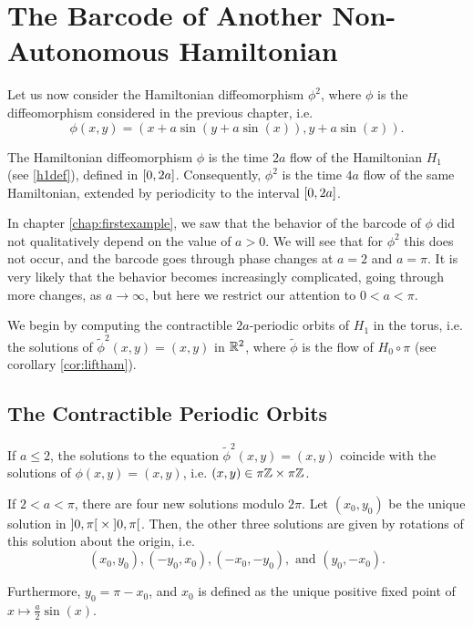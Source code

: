 \chapter{The Barcode of Another Non-Autonomous Hamiltonian}
\label{chap:secondexample}

Let us now consider the Hamiltonian diffeomorphism $\phi^2$, where $\phi$ is the diffeomorphism considered in the previous chapter, i.e.
\begin{equation}
\phi(x,y) = ( x + a \sin(y + a \sin(x)), y + a \sin(x)).
\end{equation}

The Hamiltonian diffeomorphism $\phi$ is the time $2a$ flow of the Hamiltonian $H_1$ (see \eqref{h1def}), defined in $\interval 0 {2a}$. Consequently, $\phi^2$ is the time $4a$ flow of the same Hamiltonian, extended by periodicity to the interval $\interval 0 {2a}$.

In chapter \ref{chap:firstexample}, we saw that the behavior of the barcode of $\phi$ did not qualitatively depend on the value of $a > 0$. We will see that for $\phi^2$ this does not occur, and the barcode goes through phase changes at $a = 2$ and $a = \pi$. It is very likely that the behavior becomes increasingly complicated, going through more changes, as $a \to \infty$, but here we restrict our attention to $0 < a < \pi$.

We begin by computing the contractible $2a$-periodic orbits of $H_1$ in the torus, i.e. the solutions of $\tilde \phi^2(x,y) = (x,y)$ in $\mathbb{R}^2$, where $\tilde \phi$ is the flow of $H_0 \circ \pi$ (see corollary \ref{cor:liftham}).

\section{The Contractible Periodic Orbits}

\begin{prop}\label{prop:orbitsphi2}
If $a \leq 2$, the solutions to the equation $\tilde \phi^2(x,y) = (x,y)$ coincide with the solutions of $\phi(x,y) = (x,y)$, i.e. $(x,y) \in \pi \mathbb{Z} \times \pi \mathbb{Z}$.

If $2 < a < \pi$, there are four new solutions modulo $2\pi$. Let $(x_0, y_0)$ be the unique solution in $\ointerval 0 \pi \times \ointerval 0 \pi$. Then, the other three solutions are given by rotations of this solution about the origin, i.e.
\begin{equation}
(x_0, y_0), (-y_0, x_0), (-x_0, -y_0), \text{ and } (y_0, -x_0).
\end{equation}

Furthermore, $y_0 = \pi - x_0$, and $x_0$ is defined as the unique positive fixed point of $x \mapsto \frac a 2 \sin(x)$.
\end{prop}

